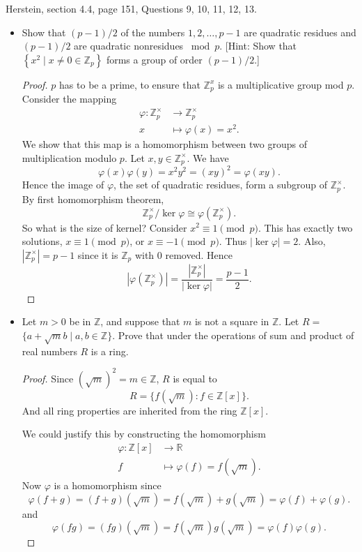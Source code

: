 Herstein, section 4.4, page 151, Questions 9, 10, 11, 12, 13.
\begin{itemize}
	\item [9.] Show that $(p-1) / 2$ of the numbers $1,2, \ldots, p-1$ are quadratic residues and $(p-1) / 2$ are quadratic nonresidues $\bmod p$. [Hint: Show that $\left\{x^2 \mid x \neq 0 \in \mathbb{Z}_p\right\}$ forms a group of order $(p-1) / 2$.]
\begin{proof}
	$p$ has to be a prime, to ensure that $\mathbb{Z}_p^{x}$ is a multiplicative group mod $ p$.
	Consider the mapping
	\begin{align*}
		\varphi: \mathbb{Z}_p^{\times } &\longrightarrow \mathbb{Z}_p^{\times } \\
		x &\longmapsto \varphi(x) = x^2
	.\end{align*}
	We show that this map is a homomorphism between two groups of multiplication modulo $p$. Let $x, y \in \mathbb{Z}_p^{\times }$. We have
	\[
		\varphi(x) \varphi(y)
		=x^2y^2 = (xy)^2
		=\varphi(xy)
	.\] 
	Hence the image of $\varphi$, the set of quadratic residues, form a subgroup of $\mathbb{Z}_p^{\times }$. By first homomorphism theorem,
	\[
		\mathbb{Z}_p^{\times } / \operatorname{ker} \varphi \cong \varphi(\mathbb{Z}_p^\times )
	.\] 
	So what is the size of kernel? Consider $x^2 \equiv 1 \pmod p$. This has exactly two solutions, $x \equiv 1 \pmod p$, or $x \equiv -1 \pmod p$. Thus $|\operatorname{ker} \varphi| = 2$. Also, $\left| \mathbb{Z}_p^{\times } \right|  = p - 1$ since it is $\mathbb{Z}_p$ with $0$ removed. Hence
	\[
		\left| \varphi(\mathbb{Z}_p^{\times }) \right| 
		= \frac{\left| \mathbb{Z}_p^{\times } \right| }{\left| \operatorname{ker} \varphi \right| } = \frac{p-1}{2}
	.\] 
\end{proof}

	\item [10.] Let $m>0$ be in $\mathbb{Z}$, and suppose that $m$ is not a square in $\mathbb{Z}$. Let $R=$ $\{a+\sqrt{m} b \mid a, b \in \mathbb{Z}\}$. Prove that under the operations of sum and product of real numbers $R$ is a ring.
\begin{proof}
	Since $(\sqrt{m} )^2 = m \in \mathbb{Z}$, $R$ is equal to
	\[
		R = \{f(\sqrt{m} ): f \in \mathbb{Z}[x]\} 
	.\] 
	And all ring properties are inherited from the ring $\mathbb{Z}[x]$.

	We could justify this by constructing the homomorphism
	\begin{align*}
		\varphi: \mathbb{Z}[x] &\longrightarrow \mathbb{R} \\
		f &\longmapsto \varphi(f) = f(\sqrt{m} )
	.\end{align*}
	Now $\varphi$ is a homomorphism since
	\[
		\varphi\left( f + g \right)  = (f+g)(\sqrt{m} ) = f(\sqrt{m} ) + g(\sqrt{m}) = \varphi(f) + \varphi(g) 
	.\] 
	and
\[
		\varphi\left( f  g \right)  = (fg)(\sqrt{m} ) = f(\sqrt{m} )  g(\sqrt{m}) = \varphi(f)  \varphi(g) 
	.\]


\end{proof}
\end{itemize}
